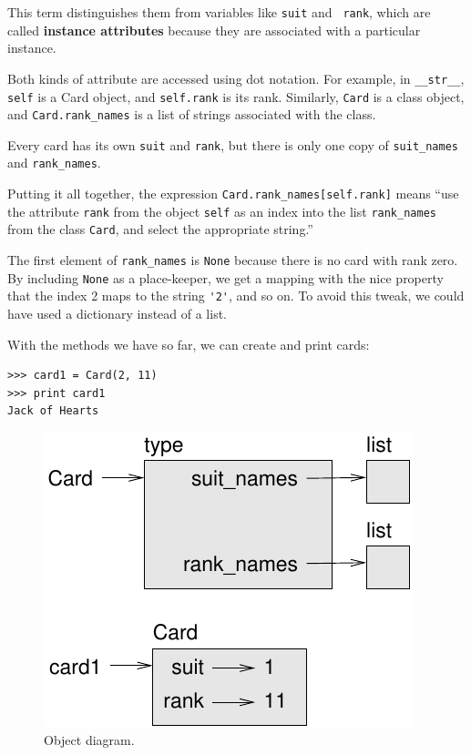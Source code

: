 \documentclass[12pt,a4paper,final,twoside,onecolumn,titlepage]{book}
\begin{document}
This term distinguishes them from variables like {\tt suit} and {\tt
  rank}, which are called {\bf instance attributes} because they are
associated with a particular instance.

Both kinds of attribute are accessed using dot notation.  For
example, in \verb"__str__", {\tt self} is a Card object,
and {\tt self.rank} is its rank.  Similarly, {\tt Card}
is a class object, and \verb"Card.rank_names" is a
list of strings associated with the class.

Every card has its own {\tt suit} and {\tt rank}, but there
is only one copy of \verb"suit_names" and \verb"rank_names".

Putting it all together, the expression
\verb"Card.rank_names[self.rank]" means ``use the attribute {\tt rank}
from the object {\tt self} as an index into the list \verb"rank_names"
from the class {\tt Card}, and select the appropriate string.''

The first element of \verb"rank_names" is {\tt None} because there
is no card with rank zero.  By including {\tt None} as a place-keeper,
we get a mapping with the nice property that the index 2 maps to the
string \verb"'2'", and so on.  To avoid this tweak, we could have
used a dictionary instead of a list.

With the methods we have so far, we can create and print cards:

\begin{verbatim}
>>> card1 = Card(2, 11)
>>> print card1
Jack of Hearts
\end{verbatim}

\begin{figure}
\centerline
{\includegraphics[scale=0.8]{figs/card1.pdf}}
\caption{Object diagram.}
\label{fig.card1}
\end{figure}
\end{document}
